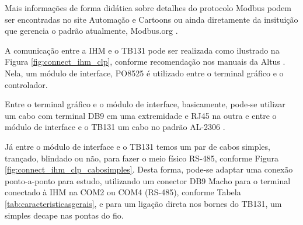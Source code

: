Mais informações de forma didática sobre detalhes do protocolo Modbus podem ser encontradas no site Automação e Cartoons \cite{automacao_cartoon} ou ainda diretamente da insituição que gerencia o padrão atualmente, Modbus.org \cite{modbus_org}.




A comunicação entre a \acrshort{IHM} e o \acrshort{TB}131 pode ser realizada como ilustrado na Figura \ref{fig:connect_ihm_clp},
%
%
conforme recomendação nos manuais da Altus \cite{connect_ihm_tb131}. 
Nela, um módulo de interface, PO8525 \cite{po8525} é utilizado entre o terminal gráfico e o controlador. 





\begin{figure}[ht!]
	\centering
\end{figure}


Entre o terminal gráfico e o módulo de interface, basicamente, pode-se utilizar um cabo com terminal DB9 em uma extremidade e RJ45 na outra \cite{al1741} e entre o módulo de interface e o TB131 um cabo no padrão AL-2306 \cite{al2306}.




Já entre o módulo de interface e o TB131 temos um par de cabos simples, trançado, blindado ou não, para fazer o meio físico RS-485, conforme Figura \ref{fig:connect_ihm_clp_cabosimples}. 
Desta forma, pode-se adaptar uma conexão ponto-a-ponto para estudo, utilizando um conector DB9 Macho para o terminal conectado à \acrshort{IHM} na COM2 ou COM4 (RS-485), conforme Tabela \ref{tab:caracteristicasgerais}, e para um ligação direta nos bornes do TB131, um simples decape nas pontas do fio.


